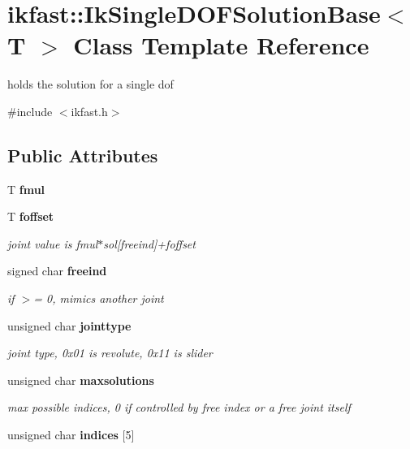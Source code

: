 \section{ikfast\-:\-:Ik\-Single\-D\-O\-F\-Solution\-Base$<$ T $>$ Class Template Reference}
\label{classikfast_1_1_ik_single_d_o_f_solution_base}


holds the solution for a single dof  




{\ttfamily \#include $<$ikfast.\-h$>$}

\subsection*{Public Attributes}
\begin{DoxyCompactItemize}
\item 
T {\bfseries fmul}\label{classikfast_1_1_ik_single_d_o_f_solution_base_adb64a33a2ce7357684c9c89d75cacd0c}

\item 
T {\bf foffset}\label{classikfast_1_1_ik_single_d_o_f_solution_base_a1d5900ae9cb2d55c396b995b976fdcef}

\begin{DoxyCompactList}\small\item\em joint value is fmul$\ast$sol[freeind]+foffset \end{DoxyCompactList}\item 
signed char {\bf freeind}\label{classikfast_1_1_ik_single_d_o_f_solution_base_adca245b0afa4133dddbd10803053bc2a}

\begin{DoxyCompactList}\small\item\em if $>$= 0, mimics another joint \end{DoxyCompactList}\item 
unsigned char {\bf jointtype}\label{classikfast_1_1_ik_single_d_o_f_solution_base_a3c458c4a2b06b4a2ccffc265cf34c6fe}

\begin{DoxyCompactList}\small\item\em joint type, 0x01 is revolute, 0x11 is slider \end{DoxyCompactList}\item 
unsigned char {\bf maxsolutions}\label{classikfast_1_1_ik_single_d_o_f_solution_base_a45404bf30c7b90131b7ce2b8045c6f6a}

\begin{DoxyCompactList}\small\item\em max possible indices, 0 if controlled by free index or a free joint itself \end{DoxyCompactList}\item 
unsigned char {\bf indices} [5]\label{classikfast_1_1_ik_single_d_o_f_solution_base_a50d8439b7f735a474f6dfe42e91de455}


\end{DoxyCompactItemize}
